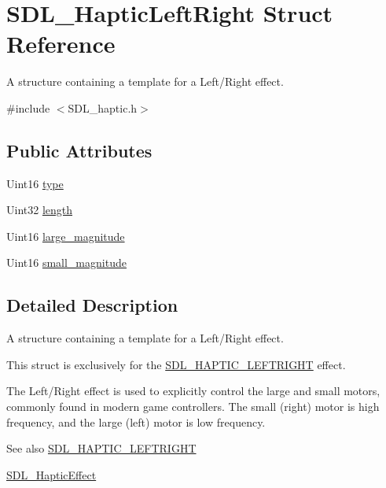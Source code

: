 \hypertarget{structSDL__HapticLeftRight}{}\section{S\+D\+L\+\_\+\+Haptic\+Left\+Right Struct Reference}
\label{structSDL__HapticLeftRight}


A structure containing a template for a Left/\+Right effect.  




{\ttfamily \#include $<$S\+D\+L\+\_\+haptic.\+h$>$}

\subsection*{Public Attributes}
\begin{DoxyCompactItemize}
\item 
Uint16 \hyperlink{structSDL__HapticLeftRight_abef79eeb482a8e623e512f0c9635e1a1}{type}
\item 
Uint32 \hyperlink{structSDL__HapticLeftRight_a5b942fee53f1ec77d3fb91a6e89b0196}{length}
\item 
Uint16 \hyperlink{structSDL__HapticLeftRight_a8cd16fe2200ef10cc4f3b4209adef959}{large\+\_\+magnitude}
\item 
Uint16 \hyperlink{structSDL__HapticLeftRight_aaa1f2c1e767a780e447d82efce6cd1cf}{small\+\_\+magnitude}
\end{DoxyCompactItemize}


\subsection{Detailed Description}
A structure containing a template for a Left/\+Right effect. 

This struct is exclusively for the \hyperlink{SDL__haptic_8h_ae047624d8458ff6400887c37a36f86d3}{S\+D\+L\+\_\+\+H\+A\+P\+T\+I\+C\+\_\+\+L\+E\+F\+T\+R\+I\+G\+HT} effect.

The Left/\+Right effect is used to explicitly control the large and small motors, commonly found in modern game controllers. The small (right) motor is high frequency, and the large (left) motor is low frequency.

\begin{DoxySeeAlso}{See also}
\hyperlink{SDL__haptic_8h_ae047624d8458ff6400887c37a36f86d3}{S\+D\+L\+\_\+\+H\+A\+P\+T\+I\+C\+\_\+\+L\+E\+F\+T\+R\+I\+G\+HT} 

\hyperlink{unionSDL__HapticEffect}{S\+D\+L\+\_\+\+Haptic\+Effect} 
\end{DoxySeeAlso}


